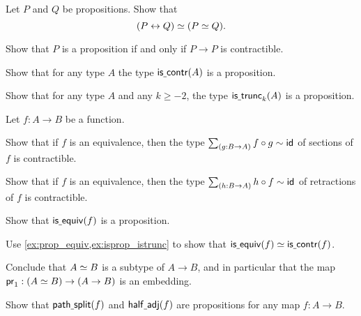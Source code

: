 \begin{exercises}
\item \label{ex:prop_equiv}
\begin{subexenum}
\item Let $P$ and $Q$ be propositions. Show that
\begin{equation*}
\eqv{(P\leftrightarrow Q)}{(\eqv{P}{Q})}.
\end{equation*}
\item Show that $P$ is a proposition if and only if $P\to P$ is contractible.
\end{subexenum}
\item \label{ex:isprop_istrunc}
\begin{subexenum}
\item Show that for any type $A$ the type $\mathsf{is\underline{\ }{}contr}(A)$ is a proposition. %
\item Show that for any type $A$ and any $k\geq-2$, the type $\mathsf{is\underline{\ }{}trunc}_{k}(A)$ is a proposition.
\end{subexenum}
\item \label{ex:isprop_isequiv}Let $f:A\to B$ be a function.
\begin{subexenum}
\item Show that if $f$ is an equivalence, then the type $\sm{g:B\to A}f\circ g\htpy \idfunc$ of sections of $f$ is contractible.
\item Show that if $f$ is an equivalence, then the type $\sm{h:B\to A}h\circ f\htpy \idfunc$ of retractions of $f$ is contractible.
\item Show that $\mathsf{is\underline{\ }{}equiv}(f)$ is a proposition.
\item Use \cref{ex:prop_equiv,ex:isprop_istrunc} to show that $\mathsf{is\underline{\ }{}equiv}(f)\simeq \mathsf{is\underline{\ }{}contr}(f)$.
\end{subexenum}
Conclude that $\eqv{A}{B}$ is a subtype of $A\to B$, and in particular that the map $\proj 1 : (\eqv{A}{B})\to (A\to B)$ is an embedding.
\item Show that $\mathsf{path\underline{\ }{}split}(f)$ and $\mathsf{half\underline{\ }{}adj}(f)$ are propositions for any map $f:A\to B$. 

\end{exercises}
